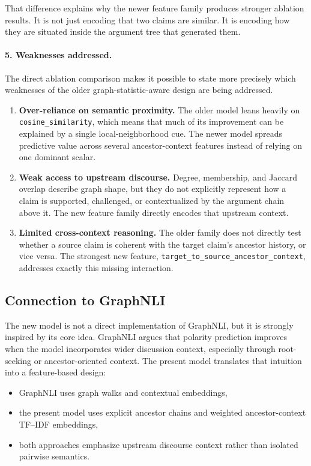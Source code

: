 \documentclass[11pt,a4paper]{article}
\begin{document}
That difference explains why the newer feature family produces stronger ablation results. It is not just encoding that two claims are similar. It is encoding how they are situated inside the argument tree that generated them.

\paragraph{5. Weaknesses addressed.}
The direct ablation comparison makes it possible to state more precisely which weaknesses of the older graph-statistic-aware design are being addressed.
\begin{enumerate}[label=\arabic*.]
  \item \textbf{Over-reliance on semantic proximity.} The older model leans heavily on \texttt{cosine\_similarity}, which means that much of its improvement can be explained by a single local-neighborhood cue. The newer model spreads predictive value across several ancestor-context features instead of relying on one dominant scalar.
  \item \textbf{Weak access to upstream discourse.} Degree, membership, and Jaccard overlap describe graph shape, but they do not explicitly represent how a claim is supported, challenged, or contextualized by the argument chain above it. The new feature family directly encodes that upstream context.
  \item \textbf{Limited cross-context reasoning.} The older family does not directly test whether a source claim is coherent with the target claim's ancestor history, or vice versa. The strongest new feature, \texttt{target\_to\_source\_ancestor\_context}, addresses exactly this missing interaction.
\end{enumerate}

\subsection{Connection to GraphNLI}
The new model is not a direct implementation of GraphNLI, but it is strongly inspired by its core idea. GraphNLI argues that polarity prediction improves when the model incorporates wider discussion context, especially through root-seeking or ancestor-oriented context. The present model translates that intuition into a feature-based design:
\begin{itemize}[leftmargin=1.5em]
  \item GraphNLI uses graph walks and contextual embeddings,
  \item the present model uses explicit ancestor chains and weighted ancestor-context TF--IDF embeddings,
  \item both approaches emphasize upstream discourse context rather than isolated pairwise semantics.
\end{itemize}
\end{document}
